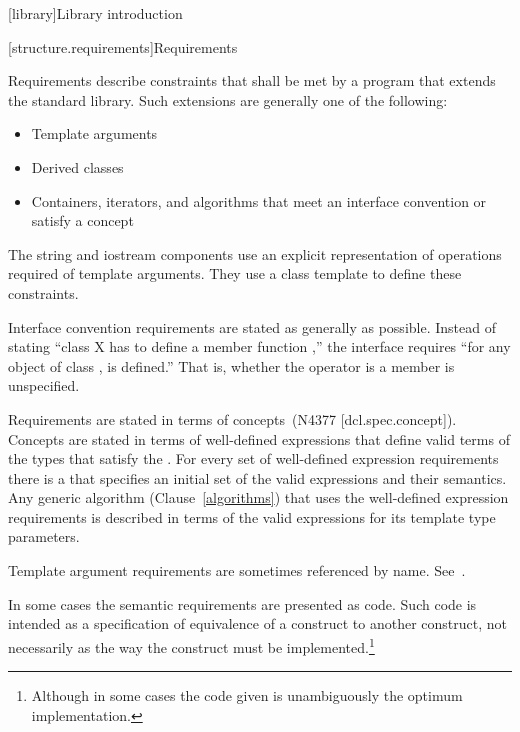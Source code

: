 \setcounter{chapter}{16}
[library]{Library introduction}

\setcounter{section}{5}
\setcounter{subsection}{1}
\setcounter{subsubsection}{2}

[structure.requirements]{Requirements}

\pnum
{}%
Requirements describe constraints that shall be met by a \Cpp program that extends the standard library.
Such extensions are generally one of the following:

\begin{itemize}
\item Template arguments
\item Derived classes
\item Containers, iterators, and algorithms that meet an interface convention
or satisfy a concept
\end{itemize}

\pnum
The string and iostream components use an explicit representation of operations
required of template arguments. They use a class template  to
define these constraints.

\pnum
Interface convention requirements are stated as generally as possible. Instead
of stating ``class X has to define a member function ,'' the
interface requires ``for any object  of class ,  is
defined.'' That is, whether the operator is a member is unspecified.

\pnum
Requirements are stated in terms of concepts~(N4377 [dcl.spec.concept]).
Concepts are stated in terms of well-defined expressions that define valid terms of
the types that satisfy the . For every set of
well-defined expression requirements there is a  that
specifies an initial set of the valid expressions and their semantics. Any generic
algorithm (Clause~\ref{algorithms}) that uses the well-defined expression requirements
is described in terms of the valid expressions for its template type parameters.

\pnum
Template argument requirements are sometimes referenced by name.
See~.

\pnum
In some cases the semantic requirements are presented as \Cpp code.
Such code is intended as a
specification of equivalence of a construct to another construct, not
necessarily as the way the construct
must be implemented.\footnote{Although in some cases the code given is
unambiguously the optimum implementation.}


